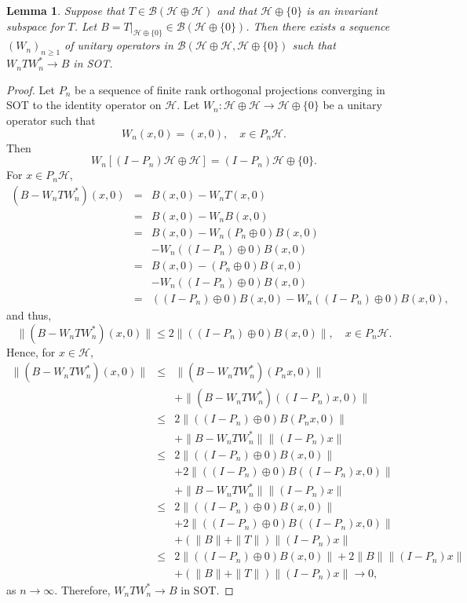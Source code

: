 \documentclass[11pt]{amsart}
\newtheorem{lemma}[theorem]{Lemma}
\theoremstyle{definition}
\numberwithin{equation}{section}
\begin{document}
\begin{lemma}\label{39}
Suppose that $T\in\mathcal{B}(\mathcal{H}\oplus\mathcal{H})$ and that $\mathcal{H}\oplus\{0\}$ is an invariant subspace for $T$. Let $B=T|_{\mathcal{H}\oplus\{0\}}\in
\mathcal{B}(\mathcal{H}\oplus\{0\})$. Then there exists a sequence $(W_{n})_{n\geq 1}$ of unitary operators in $\mathcal{B}(\mathcal{H}\oplus\mathcal{H},\mathcal{H}\oplus
\{0\})$ such that $W_{n}TW_{n}^{*}\to B$ in SOT.
\end{lemma}
\begin{proof}
Let $P_{n}$ be a sequence of finite rank orthogonal projections converging in SOT to the identity operator on $\mathcal{H}$. Let $W_{n}:\mathcal{H}\oplus\mathcal{H}\to
\mathcal{H}\oplus\{0\}$ be a unitary operator such that
\[W_{n}(x,0)=(x,0),\quad x\in P_{n}\mathcal{H}.\]
Then
\[W_{n}[(I-P_{n})\mathcal{H}\oplus\mathcal{H}]=(I-P_{n})\mathcal{H}\oplus\{0\}.\]
For $x\in P_{n}\mathcal{H}$,
\begin{eqnarray*}
(B-W_{n}TW_{n}^{*})(x,0)&=&B(x,0)-W_{n}T(x,0)
\\&=&B(x,0)-W_{n}B(x,0)
\\&=&B(x,0)-W_{n}(P_{n}\oplus 0)B(x,0)\\&&-W_{n}((I-P_{n})\oplus 0)B(x,0)
\\&=&B(x,0)-(P_{n}\oplus 0)B(x,0)\\&&-W_{n}((I-P_{n})\oplus 0)B(x,0)
\\&=&((I-P_{n})\oplus 0)B(x,0)-W_{n}((I-P_{n})\oplus 0)B(x,0),
\end{eqnarray*}
and thus,
\[\|(B-W_{n}TW_{n}^{*})(x,0)\|\leq 2\|((I-P_{n})\oplus 0)B(x,0)\|,\quad x\in P_{n}\mathcal{H}.\]
Hence, for $x\in\mathcal{H}$,
\begin{eqnarray*}
\|(B-W_{n}TW_{n}^{*})(x,0)\|&\leq&\|(B-W_{n}TW_{n}^{*})(P_{n}x,0)\|\\&&+\|(B-W_{n}TW_{n}^{*})((I-P_{n})x,0)\|
\\&\leq&2\|((I-P_{n})\oplus 0)B(P_{n}x,0)\|\\&&+\|B-W_{n}TW_{n}^{*}\|\|(I-P_{n})x\|
\\&\leq&2\|((I-P_{n})\oplus 0)B(x,0)\|\\&&+2\|((I-P_{n})\oplus 0)B((I-P_{n})x,0)\|\\&&+\|B-W_{n}TW_{n}^{*}\|\|(I-P_{n})x\|
\\&\leq&2\|((I-P_{n})\oplus 0)B(x,0)\|\\&&+2\|((I-P_{n})\oplus 0)B((I-P_{n})x,0)\|\\&&+(\|B\|+\|T\|)\|(I-P_{n})x\|
\\&\leq&2\|((I-P_{n})\oplus 0)B(x,0)\|+2\|B\|\|(I-P_{n})x\|\\&&+(\|B\|+\|T\|)\|(I-P_{n})x\|\to 0,
\end{eqnarray*}
as $n\to\infty$. Therefore, $W_{n}TW_{n}^{*}\to B$ in SOT.
\end{proof}
\end{document}
